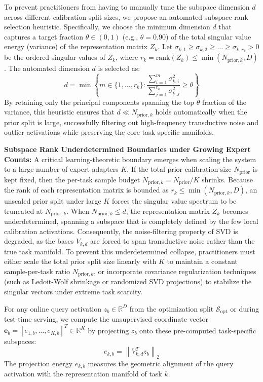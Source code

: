 To prevent practitioners from having to manually tune the subspace dimension $d$ across different calibration split sizes, we propose an automated subspace rank selection heuristic. Specifically, we choose the minimum dimension $d$ that captures a target fraction $\theta \in (0, 1)$ (e.g., $\theta = 0.90$) of the total singular value energy (variance) of the representation matrix $Z_k$. Let $\sigma_{k, 1} \ge \sigma_{k, 2} \ge \dots \ge \sigma_{k, r_k} > 0$ be the ordered singular values of $Z_k$, where $r_k = \text{rank}(Z_k) \le \min(N_{\text{prior}, k}, D)$. The automated dimension $d$ is selected as:
\begin{equation}
  d = \min \left\{ m \in \{1, \dots, r_k\} : \frac{\sum_{i=1}^m \sigma_{k, i}^2}{\sum_{j=1}^{r_k} \sigma_{k, j}^2} \ge \theta \right\}
  \label{eq:automated_rank}
\end{equation}
By retaining only the principal components spanning the top $\theta$ fraction of the variance, this heuristic ensures that $d \ll N_{\text{prior}, k}$ holds automatically when the prior split is large, successfully filtering out high-frequency transductive noise and outlier activations while preserving the core task-specific manifolds.

\textbf{Subspace Rank Underdetermined Boundaries under Growing Expert Counts:} 
A critical learning-theoretic boundary emerges when scaling the system to a large number of expert adapters $K$. If the total prior calibration size $N_{\text{prior}}$ is kept fixed, then the per-task sample budget $N_{\text{prior}, k} = N_{\text{prior}}/K$ shrinks. Because the rank of each representation matrix is bounded as $r_k \le \min(N_{\text{prior}, k}, D)$, an unscaled prior split under large $K$ forces the singular value spectrum to be truncated at $N_{\text{prior}, k}$. When $N_{\text{prior}, k} \le d$, the representation matrix $Z_k$ becomes underdetermined, spanning a subspace that is completely defined by the few local calibration activations. Consequently, the noise-filtering property of SVD is degraded, as the bases $V_{k, d}$ are forced to span transductive noise rather than the true task manifold. To prevent this underdetermined collapse, practitioners must either scale the total prior split size linearly with $K$ to maintain a constant sample-per-task ratio $N_{\text{prior}, k}$, or incorporate covariance regularization techniques (such as Ledoit-Wolf shrinkage or randomized SVD projections) to stabilize the singular vectors under extreme task scarcity.

For any online query activation $z_b \in \mathbb{R}^D$ from the optimization split $\mathcal{S}_{\text{opt}}$ or during test-time serving, we compute the unsupervised coordinate vector $\mathbf{e}_b = [e_{1, b}, \dots, e_{K, b}]^T \in \mathbb{R}^K$ by projecting $z_b$ onto these pre-computed task-specific subspaces:
\begin{equation}
  e_{k, b} = \left\| V_{k, d}^T z_b \right\|_2
  \label{eq:projection}
\end{equation}
The projection energy $e_{k, b}$ measures the geometric alignment of the query activation with the representation manifold of task $k$.

